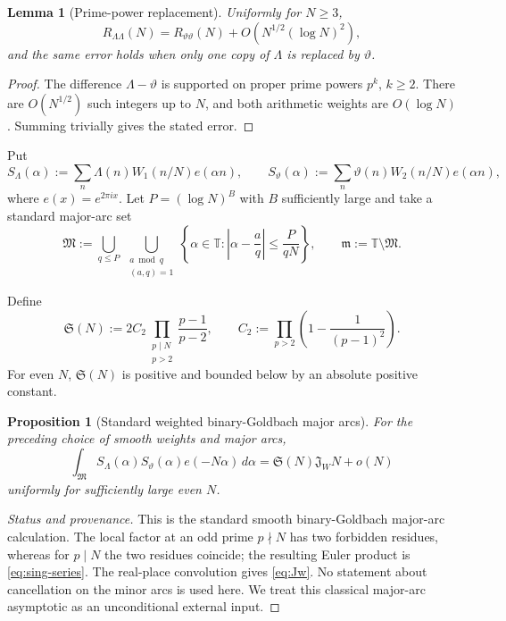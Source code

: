 \documentclass[11pt]{article}
\newtheorem{lemma}[theorem]{Lemma}
\newtheorem{proposition}[theorem]{Proposition}
\theoremstyle{definition}
\theoremstyle{remark}
\newcommand{\T}{\mathbb T}
\newcommand{\1}{\mathbf 1}
\newcommand{\Mcal}{\mathfrak M}
\newcommand{\mcal}{\mathfrak m}
\newcommand{\SG}{\mathfrak S}
\newcommand{\Jw}{\mathfrak J_W}
\begin{document}
\begin{lemma}[Prime-power replacement]\label{lem:pp}
Uniformly for \(N\ge3\),
\[
 R_{\Lambda\Lambda}(N)=R_{\vartheta\vartheta}(N)
 +O\!\left(N^{1/2}(\log N)^2\right),
\]
and the same error holds when only one copy of \(\Lambda\) is replaced by \(\vartheta\).
\end{lemma}

\begin{proof}
The difference \(\Lambda-\vartheta\) is supported on proper prime powers \(p^k\), \(k\ge2\).  There are \(O(N^{1/2})\) such integers up to \(N\), and both arithmetic weights are \(O(\log N)\).  Summing trivially gives the stated error.
\end{proof}

Put
\[
 S_\Lambda(\alpha):=\sum_n\Lambda(n)W_1(n/N)e(\alpha n),
 \qquad
 S_\vartheta(\alpha):=\sum_n\vartheta(n)W_2(n/N)e(\alpha n),
\]
where \(e(x)=e^{2\pi i x}\).  Let \(P=(\log N)^B\) with \(B\) sufficiently large and take a standard major-arc set
\[
 \Mcal
 :=\bigcup_{q\le P}\ \bigcup_{\substack{a\bmod q\\(a,q)=1}}
 \left\{\alpha\in\T:\left|\alpha-\frac aq\right|\le\frac{P}{qN}\right\},
 \qquad
 \mcal:=\T\setminus\Mcal.
\]

Define
\begin{equation}\label{eq:sing-series}
 \SG(N)
 :=2C_2\prod_{\substack{p\mid N\\p>2}}\frac{p-1}{p-2},
 \qquad
 C_2:=\prod_{p>2}\left(1-\frac1{(p-1)^2}\right).
\end{equation}
For even \(N\), \(\SG(N)\) is positive and bounded below by an absolute positive constant.

\begin{proposition}[Standard weighted binary-Goldbach major arcs]\label{prop:major}
For the preceding choice of smooth weights and major arcs,
\begin{equation}\label{eq:major}
 \int_{\Mcal}S_\Lambda(\alpha)S_\vartheta(\alpha)e(-N\alpha)\,d\alpha
 =\SG(N)\Jw N+o(N)
\end{equation}
uniformly for sufficiently large even \(N\).
\end{proposition}

\begin{proof}[Status and provenance]
This is the standard smooth binary-Goldbach major-arc calculation.  The local factor at an odd prime \(p\nmid N\) has two forbidden residues, whereas for \(p\mid N\) the two residues coincide; the resulting Euler product is \eqref{eq:sing-series}.  The real-place convolution gives \eqref{eq:Jw}.  No statement about cancellation on the minor arcs is used here.  We treat this classical major-arc asymptotic as an unconditional external input.
\end{proof}
\end{document}
